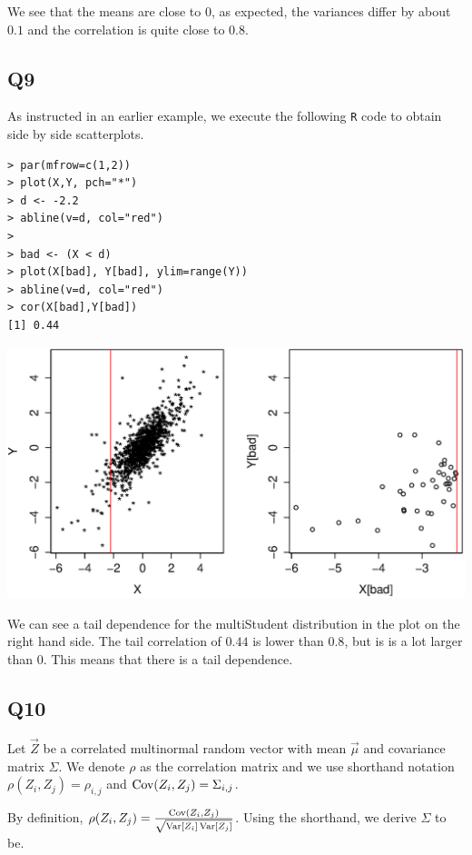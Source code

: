 We see that the means are close to $0$, as expected, the variances differ by about $0.1$ and the correlation is quite close to $0.8$.

\subsection*{Q9}

As instructed in an earlier example, we execute the following \verb|R| code to obtain side by side scatterplots.

\begin{verbatim}
> par(mfrow=c(1,2))
> plot(X,Y, pch="*")
> d <- -2.2
> abline(v=d, col="red")
> 
> bad <- (X < d)
> plot(X[bad], Y[bad], ylim=range(Y))
> abline(v=d, col="red")
> cor(X[bad],Y[bad])
[1] 0.44
\end{verbatim}

\includegraphics[scale=.6]{NL1_Q9_scatterplot.eps} 

We can see a tail dependence for the multiStudent distribution in the plot on the right hand side. The tail correlation of $0.44$ is lower than $0.8$, but is is a lot larger than $0$. This means that there is a tail dependence.

\subsection*{Q10}

Let $\vec{Z}$ be a correlated multinormal random vector with mean $\vec{\mu}$ and covariance matrix $\Sigma$. We denote $\rho$ as the correlation matrix and we use shorthand notation $\rho(Z_i,Z_j) = \rho_{i,j}$ and $\operatorname{\text{Cov}}(Z_i,Z_j) = \Sigma_{i,j}$.

By definition, $\rho(Z_i,Z_j) = \frac{\operatorname{\text{Cov}}(Z_i,Z_j)}{\sqrt{\operatorname{\text{Var}}[Z_i]\operatorname{\text{Var}}[Z_j]}}$. Using the shorthand, we derive $\Sigma$ to be.

